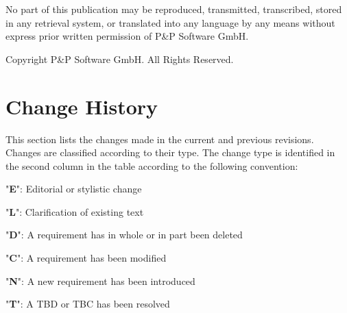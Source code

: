 \documentclass[a4paper,10pt]{article}
\let\stdsection\section
\renewcommand\section{\newpage\stdsection}
\newenvironment{fw_itemize}						%
{\begin{itemize}
  \setlength{\itemsep}{1mm}
  \setlength{\parskip}{0pt}
  \setlength{\parsep}{0pt}}
{\end{itemize}}
\begin{document}
\newpage
\vspace*{\fill}
\begin{center}
No part of this publication may be reproduced, transmitted, transcribed, stored in any retrieval system, or translated into any language by any means without express prior written permission of P\&P Software GmbH.
\end{center}

\begin{center}
Copyright  P\&P Software GmbH. All Rights Reserved. 
\end{center}
\vspace*{\fill}

\newpage
\tableofcontents

\newpage
\listoffigures
\listoftables

\newpage

\setlength{\parskip}{3mm}						%

\section{Change History}

This section lists the changes made in the current and previous revisions. Changes are classified according to their type. The change type is identified in the second column in the table according to the following convention:

\begin{fw_itemize}
\item "\textbf{E}": Editorial or stylistic change
\item "\textbf{L}": Clarification of existing text
\item "\textbf{D}": A requirement has in whole or in part been deleted
\item "\textbf{C}": A requirement has been modified
\item "\textbf{N}": A new requirement has been introduced
\item "\textbf{T}": A TBD or TBC has been resolved
\end{fw_itemize}
\end{document}
